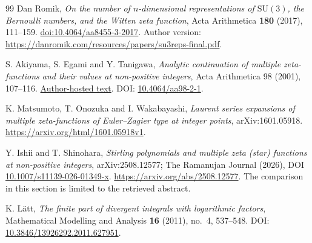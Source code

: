 \documentclass[11pt,a4paper]{article}
\theoremstyle{definition}
\theoremstyle{remark}
\numberwithin{equation}{section}
\begin{document}
\begin{thebibliography}{99}
Dan Romik, \emph{On the number of $n$-dimensional representations of
$\mathrm{SU}(3)$, the Bernoulli numbers, and the Witten zeta function},
Acta Arithmetica \textbf{180} (2017), 111--159.
\href{https://doi.org/10.4064/aa8455-3-2017}{doi:10.4064/aa8455-3-2017}.
Author version:
\url{https://danromik.com/resources/papers/su3reps-final.pdf}.

S. Akiyama, S. Egami and Y. Tanigawa,
\emph{Analytic continuation of multiple zeta-functions and their values
at non-positive integers}, Acta Arithmetica 98 (2001), 107--116.
\href{https://math.tsukuba.ac.jp/~akiyama/papers/Mzffin.pdf}{Author-hosted text}.
DOI: \href{https://doi.org/10.4064/aa98-2-1}{10.4064/aa98-2-1}.

K. Matsumoto, T. Onozuka and I. Wakabayashi,
\emph{Laurent series expansions of multiple zeta-functions of
Euler--Zagier type at integer points}, arXiv:1601.05918.
\url{https://arxiv.org/html/1601.05918v1}.

Y. Ishii and T. Shinohara,
\emph{Stirling polynomials and multiple zeta (star) functions at
non-positive integers}, arXiv:2508.12577; The Ramanujan Journal (2026),
DOI \href{https://doi.org/10.1007/s11139-026-01349-x}{10.1007/s11139-026-01349-x}.
\url{https://arxiv.org/abs/2508.12577}.
The comparison in this section is limited to the retrieved abstract.

K. L\"att, \emph{The finite part of divergent integrals with logarithmic
factors}, Mathematical Modelling and Analysis \textbf{16} (2011), no.~4,
537--548. DOI: \href{https://doi.org/10.3846/13926292.2011.627951}{10.3846/13926292.2011.627951}.


\end{thebibliography}
\end{document}
